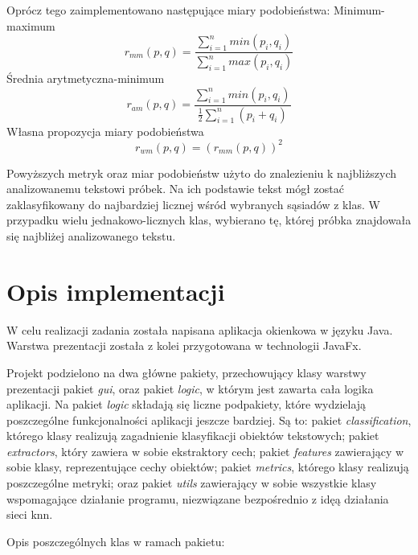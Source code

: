 \documentclass{classrep}
\begin{document}
Oprócz tego zaimplementowano następujące miary podobieństwa: \newline
Minimum-maximum
\begin{equation}
r_{mm}(p,q) = \frac{\sum_{i=1}^{n}min(p_{i},q_{i})}{\sum_{i=1}^{n}max(p_{i},q_{i})}
\end{equation}
Średnia arytmetyczna-minimum
\begin{equation}
r_{am}(p,q) = \frac{\sum_{i=1}^{n}min(p_{i},q_{i})}{\frac{1}{2}\sum_{i=1}^{n}(p_{i}+q_{i})}
\end{equation}
Własna propozycja miary podobieństwa
\begin{equation}
r_{wm}(p,q) = (r_{mm}(p,q))^{2}
\end{equation}

Powyższych metryk oraz miar podobieństw użyto do znalezieniu k najbliższych analizowanemu tekstowi próbek. Na ich podstawie tekst mógł zostać zaklasyfikowany do najbardziej licznej wśród wybranych sąsiadów z klas. W przypadku wielu jednakowo-licznych klas, wybierano tę, której próbka znajdowała się najbliżej analizowanego tekstu.

\section{Opis implementacji}

W celu realizacji zadania została napisana aplikacja okienkowa w języku Java. Warstwa prezentacji została z kolei przygotowana w technologii JavaFx\cite{JavaFX}.

Projekt podzielono na dwa główne pakiety, przechowujący klasy warstwy prezentacji pakiet \textit{gui}, oraz pakiet \textit{logic}, w którym jest zawarta cała logika aplikacji. Na pakiet \textit{logic} składają się liczne podpakiety, które wydzielają poszczególne funkcjonalności aplikacji jeszcze bardziej. Są to: pakiet \textit{classification}, którego klasy realizują zagadnienie klasyfikacji obiektów tekstowych; pakiet \textit{extractors}, który zawiera w sobie ekstraktory cech; pakiet \textit{features} zawierający w sobie klasy, reprezentujące cechy obiektów; pakiet \textit{metrics}, którego klasy realizują poszczególne metryki; oraz pakiet \textit{utils} zawierający w sobie wszystkie klasy wspomagające działanie programu, niezwiązane bezpośrednio z idęą działania sieci knn.

Opis poszczególnych klas w ramach pakietu:
\end{document}
